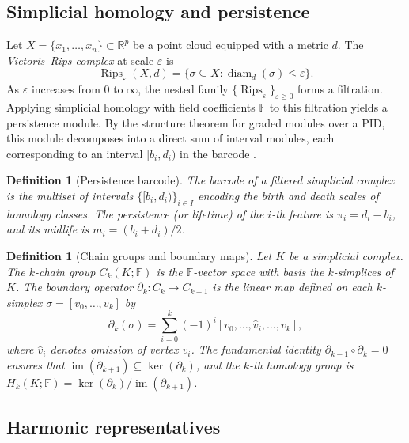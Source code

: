 \documentclass[11pt]{article}
\newtheorem{definition}[theorem]{Definition}
\DeclareMathOperator{\Rips}{Rips}
\DeclareMathOperator{\diam}{diam}
\begin{document}
\subsection{Simplicial homology and persistence}

Let $X = \{x_1, \ldots, x_n\} \subset \mathbb{R}^p$ be a point cloud equipped with a metric $d$.
The \emph{Vietoris--Rips complex} at scale $\varepsilon$ is
\[
\Rips_\varepsilon(X, d) = \bigl\{ \sigma \subseteq X : \diam_d(\sigma) \le \varepsilon \bigr\}.
\]
As $\varepsilon$ increases from $0$ to $\infty$, the nested family $\{\Rips_\varepsilon\}_{\varepsilon \ge 0}$ forms a filtration.
Applying simplicial homology with field coefficients $\mathbb{F}$ to this filtration yields a persistence module.
By the structure theorem for graded modules over a PID, this module decomposes into a direct sum of interval modules, each corresponding to an interval $[b_i, d_i)$ in the barcode \cite{zomorodian2005}.

\begin{definition}[Persistence barcode]\label{def:barcode}
The \emph{barcode} of a filtered simplicial complex is the multiset of intervals $\{[b_i, d_i)\}_{i \in I}$ encoding the birth and death scales of homology classes.
The \emph{persistence} (or \emph{lifetime}) of the $i$-th feature is $\pi_i = d_i - b_i$, and its \emph{midlife} is $m_i = (b_i + d_i)/2$.
\end{definition}

\begin{definition}[Chain groups and boundary maps]\label{def:chains}
Let $K$ be a simplicial complex.
The \emph{$k$-chain group} $C_k(K; \mathbb{F})$ is the $\mathbb{F}$-vector space with basis the $k$-simplices of $K$.
The \emph{boundary operator} $\partial_k: C_k \to C_{k-1}$ is the linear map defined on each $k$-simplex $\sigma = [v_0, \ldots, v_k]$ by
\[
\partial_k(\sigma) = \sum_{i=0}^k (-1)^i [v_0, \ldots, \hat{v}_i, \ldots, v_k],
\]
where $\hat{v}_i$ denotes omission of vertex $v_i$.
The fundamental identity $\partial_{k-1} \circ \partial_k = 0$ ensures that $\operatorname{im}(\partial_{k+1}) \subseteq \ker(\partial_k)$, and the $k$-th homology group is $H_k(K; \mathbb{F}) = \ker(\partial_k) / \operatorname{im}(\partial_{k+1})$.
\end{definition}

\subsection{Harmonic representatives}
\end{document}
